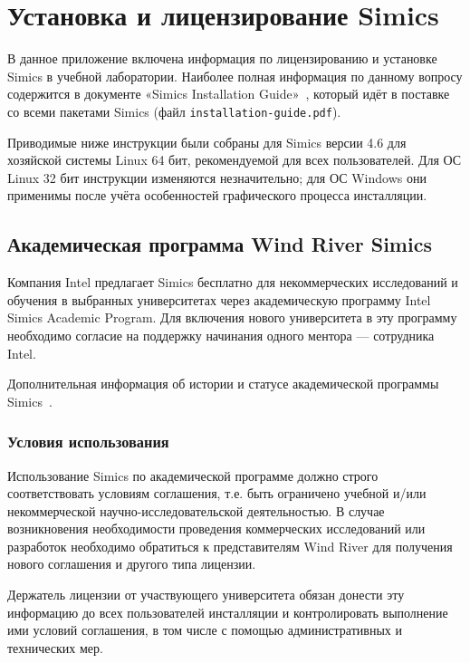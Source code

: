 \chapter{Установка и лицензирование Simics} \label{chap:installation-notes}

В данное приложение включена информация по лицензированию и установке Simics в учебной лаборатории. Наиболее полная информация по данному вопросу содержится в документе «Simics Installation Guide»~\cite{installation}, который идёт в поставке со всеми пакетами Simics (файл \texttt{installation-guide.pdf}).

Приводимые ниже инструкции были собраны для Simics версии 4.6 для хозяйской системы Linux 64 бит, рекомендуемой для всех пользователей. Для ОС Linux 32 бит инструкции изменяются незначительно; для ОС Windows они применимы после учёта особенностей графического процесса инсталляции.

\section{Академическая программа Wind River Simics}

Компания Intel предлагает Simics бесплатно для некоммерческих исследований и обучения в выбранных университетах через академическую программу Intel Simics Academic Program. Для включения нового университета в эту программу необходимо согласие на поддержку начинания одного ментора --- сотрудника Intel. 

Дополнительная информация об истории и статусе академической программы Simics~\cite{engblom-academic-simics}.

\subsection{Условия использования}

Использование Simics по академической программе должно строго соответствовать условиям соглашения, т.е. быть ограничено учебной и/или некоммерческой научно-исследовательской деятельностью. В случае возникновения необходимости проведения коммерческих исследований или разработок необходимо обратиться к представителям Wind River для получения нового соглашения и другого типа лицензии.

Держатель лицензии от участвующего университета обязан донести эту информацию до всех пользователей инсталляции и контролировать выполнение ими условий соглашения, в том числе с помощью административных и технических мер.

